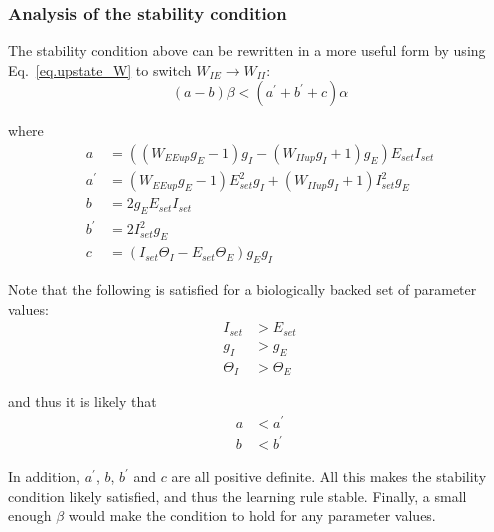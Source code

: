 \documentclass[
twocolumn,
]{article}
\newcommand{\EE}{\mathit{EE}}
\newcommand{\IE}{\mathit{IE}}
\newcommand{\II}{\mathit{II}}
\newcommand{\set}{\mathit{set}}
\newcommand{\up}{\mathit{up}}
\begin{document}
\subsubsection{Analysis of the stability condition}

The stability condition above can be rewritten in a more useful form by using Eq.\ \ref{eq.upstate_W} to switch $W_{\IE} \rightarrow W_{\II}$:
\begin{equation}
(a - b)\beta < (a^\prime + b^\prime + c) \alpha
\end{equation}
  
\noindent where
\begin{displaymath}
\begin{aligned}
a & = ((W_{\EE\up}g_E - 1) g_I - (W_{\II\up}g_I + 1) g_E) E_{\set} I_{\set} \\
a^\prime & = (W_{\EE\up}g_E - 1)E_{\set}^2 g_I + (W_{\II\up}g_I + 1)I_{\set}^2 g_E \\
b & = 2g_E E_{\set} I_{\set} \\
b^\prime & = 2I_{\set}^2 g_E \\
c & = (I_{\set}\Theta_I - E_{\set}\Theta_E)g_E g_I
\end{aligned}
\end{displaymath}

\noindent Note that the following is satisfied for a biologically backed set of parameter values:
\begin{displaymath}
\begin{aligned}
I_{\set} & > E_{\set} \\
g_I & > g_E \\
\Theta_I & > \Theta_E
\end{aligned}
\end{displaymath}

\noindent and thus it is likely that
\begin{displaymath}
\begin{aligned}
a & < a^\prime \\
b & < b^\prime
\end{aligned}
\end{displaymath}

\noindent In addition, $a^\prime$, $b$, $b^\prime$ and $c$ are all positive definite. All this makes the stability condition likely satisfied, and thus the learning rule stable. Finally, a small enough $\beta$ would make the condition to hold for any parameter values.
\end{document}
